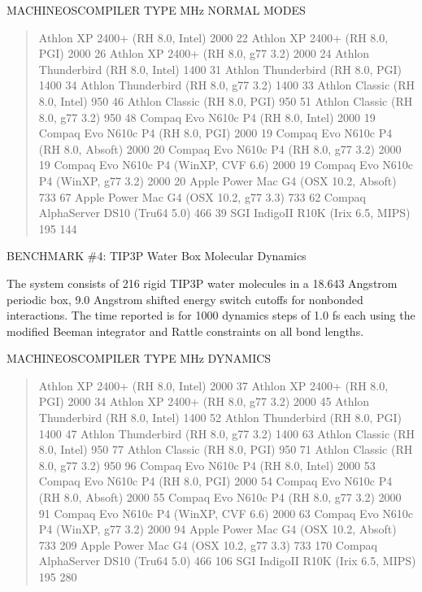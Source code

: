\documentclass[letterpaper,11pt,english]{sphinxmanual}
\begin{document}
MACHINE\sphinxhyphen{}OS\sphinxhyphen{}COMPILER TYPE        MHz     NORMAL MODES
\begin{quote}

Athlon XP 2400+ (RH 8.0, Intel)        2000    22
Athlon XP 2400+ (RH 8.0, PGI)  2000    26
Athlon XP 2400+ (RH 8.0, g77 3.2)      2000    24
Athlon Thunderbird (RH 8.0, Intel)     1400    31
Athlon Thunderbird (RH 8.0, PGI)       1400    34
Athlon Thunderbird (RH 8.0, g77 3.2)   1400    33
Athlon Classic (RH 8.0, Intel) 950     46
Athlon Classic (RH 8.0, PGI)   950     51
Athlon Classic (RH 8.0, g77 3.2)       950     48
Compaq Evo N610c P4 (RH 8.0, Intel)    2000    19
Compaq Evo N610c P4 (RH 8.0, PGI)      2000    19
Compaq Evo N610c P4 (RH 8.0, Absoft)   2000    20
Compaq Evo N610c P4 (RH 8.0, g77 3.2)  2000    19
Compaq Evo N610c P4 (WinXP, CVF 6.6)   2000    19
Compaq Evo N610c P4 (WinXP, g77 3.2)   2000    20
Apple Power Mac G4 (OSX 10.2, Absoft)  733     67
Apple Power Mac G4 (OSX 10.2, g77 3.3) 733     62
Compaq AlphaServer DS10 (Tru64 5.0)    466     39
SGI IndigoII R10K (Irix 6.5, MIPS)     195     144
\end{quote}

BENCHMARK \#4:  TIP3P Water Box Molecular Dynamics

The system consists of 216 rigid TIP3P water molecules in a 18.643 Angstrom periodic box, 9.0 Angstrom shifted energy switch cutoffs for nonbonded interactions. The time reported is for 1000 dynamics steps of 1.0 fs each using the modified Beeman integrator and Rattle constraints on all bond lengths.

MACHINE\sphinxhyphen{}OS\sphinxhyphen{}COMPILER TYPE        MHz     DYNAMICS
\begin{quote}

Athlon XP 2400+ (RH 8.0, Intel)        2000    37
Athlon XP 2400+ (RH 8.0, PGI)  2000    34
Athlon XP 2400+ (RH 8.0, g77 3.2)      2000    45
Athlon Thunderbird (RH 8.0, Intel)     1400    52
Athlon Thunderbird (RH 8.0, PGI)       1400    47
Athlon Thunderbird (RH 8.0, g77 3.2)   1400    63
Athlon Classic (RH 8.0, Intel) 950     77
Athlon Classic (RH 8.0, PGI)   950     71
Athlon Classic (RH 8.0, g77 3.2)       950     96
Compaq Evo N610c P4 (RH 8.0, Intel)    2000    53
Compaq Evo N610c P4 (RH 8.0, PGI)      2000    54
Compaq Evo N610c P4 (RH 8.0, Absoft)   2000    55
Compaq Evo N610c P4 (RH 8.0, g77 3.2)  2000    91
Compaq Evo N610c P4 (WinXP, CVF 6.6)   2000    63
Compaq Evo N610c P4 (WinXP, g77 3.2)   2000    94
Apple Power Mac G4 (OSX 10.2, Absoft)  733     209
Apple Power Mac G4 (OSX 10.2, g77 3.3) 733     170
Compaq AlphaServer DS10 (Tru64 5.0)    466     106
SGI IndigoII R10K (Irix 6.5, MIPS)     195     280
\end{quote}
\end{document}
